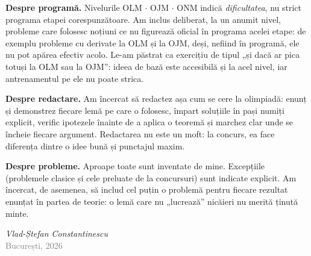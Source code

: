 \medskip
\noindent \textbf{Despre programă.} Nivelurile OLM $\cdot$ OJM $\cdot$ ONM indică \emph{dificultatea}, nu strict
programa etapei corespunzătoare. Am inclus deliberat, la un anumit nivel, probleme care folosesc noțiuni ce nu
figurează oficial în programa acelei etape: de exemplu probleme cu derivate la OLM și la OJM, deși, nefiind în
programă, ele nu pot apărea efectiv acolo. Le-am păstrat ca exercițiu de tipul „și dacă ar pica totuși la OLM
sau la OJM'': ideea de bază este accesibilă și la acel nivel, iar antrenamentul pe ele nu poate strica.

\medskip
\noindent \textbf{Despre redactare.} Am încercat să redactez așa cum se cere la olimpiadă: enunț și demonstrez
fiecare lemă pe care o folosesc, împart soluțiile în pași numiți explicit, verific ipotezele înainte de a aplica
o teoremă și marchez clar unde se încheie fiecare argument. Redactarea nu este un moft: la concurs, ea face
diferența dintre o idee bună și punctajul maxim.

\medskip
\noindent \textbf{Despre probleme.} Aproape toate sunt inventate de mine. Excepțiile (problemele clasice și cele preluate de la concursuri) sunt indicate explicit. Am încercat, de asemenea, să includ cel puțin o problemă pentru fiecare rezultat enunțat în partea de teorie: o lemă care nu „lucrează'' nicăieri nu merită ținută minte.

\vspace{1cm}
\begin{flushright}
{\itshape Vlad-Ștefan Constantinescu}\\
{\small\textcolor{grey}{București, 2026}}
\end{flushright}
\clearpage
